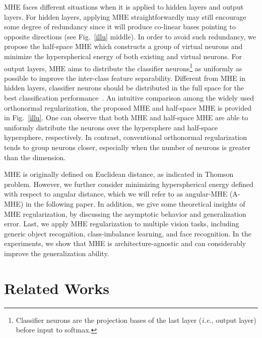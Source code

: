 \par

MHE faces different situations when it is applied to hidden layers and output layers. For hidden layers, applying MHE straightforwardly may still encourage some degree of redundancy since it will produce co-linear bases pointing to opposite directions (see Fig.~\ref{illu} middle). In order to avoid such redundancy, we propose the half-space MHE which constructs a group of virtual neurons and minimize the hyperspherical energy of both existing and virtual neurons. For output layers, MHE aims to distribute the classifier neurons\footnote{Classifier neurons are the projection bases of the last layer (\emph{i.e.}, output layer) before input to softmax.} as uniformly as possible to improve the inter-class feature separability. Different from MHE in hidden layers, classifier neurons should be distributed in the full space for the best classification performance~\cite{liu2016large,liu2017sphereface}. An intuitive comparison among the widely used orthonormal regularization, the proposed MHE and half-space MHE is provided in Fig.~\ref{illu}. One can observe that both MHE and half-space MHE are able to uniformly distribute the neurons over the hypersphere and half-space hypersphere, respectively. In contrast, conventional orthonormal regularization tends to group neurons closer, especially when the number of neurons is greater than the dimension. 

\par
MHE is originally defined on Euclidean distance, as indicated in Thomson problem. However, we further consider minimizing hyperspherical energy defined with respect to angular distance, which we will refer to as angular-MHE (A-MHE) in the following paper. In addition, we give some theoretical insights of MHE regularization, by discussing the asymptotic behavior and generalization error. Last, we apply MHE regularization to multiple vision tasks, including generic object recognition, class-imbalance learning, and face recognition. In the experiments, we show that MHE is architecture-agnostic and can considerably improve the generalization ability.

\section{Related Works}

